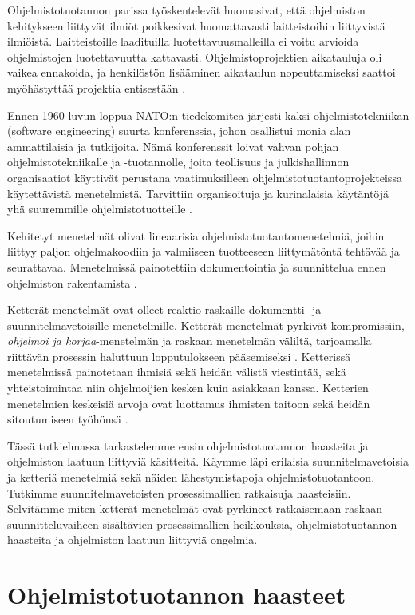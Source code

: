 \documentclass[finnish]{tktltiki2}
\theoremstyle{definition}
\theoremstyle{remark}
\begin{document}
Ohjelmistotuotannon parissa työskentelevät huomasivat, että ohjelmiston kehitykseen liittyvät ilmiöt poikkesivat huomattavasti laitteistoihin liittyvistä ilmiöistä. Laitteistoille laadituilla luotettavuusmalleilla ei voitu arvioida ohjelmistojen luotettavuutta kattavasti. Ohjelmistoprojektien aikatauluja oli vaikea ennakoida, ja henkilöstön lisääminen aikataulun nopeuttamiseksi saattoi myöhästyttää projektia entisestään \cite{BOE06}.

Ennen 1960-luvun loppua NATO:n tiedekomitea järjesti kaksi ohjelmistotekniikan (software engineering) suurta konferenssia, johon osallistui monia alan ammattilaisia ja tutkijoita. Nämä konferenssit loivat vahvan pohjan ohjelmistotekniikalle ja -tuotannolle, joita teollisuus ja julkishallinnon organisaatiot käyttivät perustana vaatimuksilleen ohjelmistotuotantoprojekteissa käytettävistä menetelmistä. Tarvit\-tiin organisoituja ja kurinalaisia käytäntöjä yhä suuremmille ohjelmistotuotteille \cite{BOE06}.

Kehitetyt menetelmät olivat lineaarisia ohjelmistotuotantomenetelmiä, joihin liittyy paljon ohjelmakoodiin ja valmiiseen tuotteeseen liittymätöntä tehtävää ja seurattavaa. Menetelmissä painotettiin dokumentointia ja suunnittelua ennen ohjelmiston rakentamista \cite{FOW01a}.

Ketterät menetelmät ovat olleet reaktio raskaille dokumentti- ja suunnitelmavetoisille menetelmille. Ketterät menetelmät pyrkivät kompromissiin, \textit{ohjelmoi ja korjaa}-menetelmän ja raskaan menetelmän väliltä, tarjoamalla riittävän prosessin haluttuun lopputulokseen pääsemiseksi \cite{FOW01a}. Ketterissä menetelmissä painotetaan ihmisiä sekä heidän välistä viestintää, sekä yhteistoimintaa niin ohjelmoijien kesken kuin asiakkaan kanssa. Ketterien menetelmien keskeisiä arvoja ovat luottamus ihmisten taitoon sekä heidän sitoutumiseen työhönsä \cite{COH01}.

Tässä tutkielmassa tarkastelemme ensin ohjelmistotuotannon haasteita ja ohjelmiston laatuun liittyviä käsitteitä. Käymme läpi erilaisia suunnitelmavetoisia ja ketteriä menetelmiä sekä näiden lähestymistapoja ohjelmistotuotantoon. Tutkimme suunnitelmavetoisten prosessimallien ratkaisuja haasteisiin. Selvitämme miten ketterät menetelmät ovat pyrkineet ratkaisemaan raskaan suunnitteluvaiheen sisältävien prosessimallien heikkouksia, ohjelmistotuotannon haasteita ja ohjelmiston laatuun liittyviä ongelmia. 

\section{Ohjelmistotuotannon haasteet}
\end{document}
